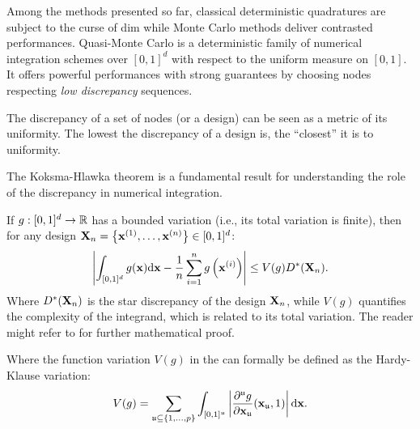 Among the methods presented so far, classical deterministic quadratures are subject to the curse of dim while Monte Carlo methods deliver contrasted performances. 
Quasi-Monte Carlo is a deterministic family of numerical integration schemes over $[0, 1]^d$ with respect to the uniform measure on $[0, 1]$. 
It offers powerful performances with strong guarantees by choosing nodes respecting \textit{low discrepancy} sequences. 

The discrepancy of a set of nodes (or a design) can be seen as a metric of its uniformity. 
The lowest the discrepancy of a design is, the ``closest'' it is to uniformity. 

The Koksma-Hlawka theorem \citep*{morokoff_1995,leobacher_2014} is a fundamental result for understanding the role of the discrepancy in numerical integration. 
\begin{theorem}
    If $g:[0, 1]^d\rightarrow\mathbb{R}$ has a bounded variation (i.e., its total variation is finite), then for any design ${\bf X}_n = \left\{{\bf x}^{(1)}, \dots, {\bf x}^{(n)}\right\} \in [0, 1]^d$:
    \begin{equation}
        \left| \int_{[0, 1]^d} g({\bf x}) \mathrm{d}{\bf x} - \frac1n \sum_{i=1}^n g\left({\bf x}^{(i)}\right)\right| \leq  V(g) D^*({\bf X}_n).
        \label{eq:KH_inequality}
    \end{equation}
    Where $D^*({\bf X}_n)$ is the star discrepancy of the design ${\bf X}_n$, while $V(g)$ quantifies the complexity of the integrand, which is related to its total variation. 
    The reader might refer to  for further mathematical proof.
\end{theorem}

Where the function variation $V(g)$ in the  can formally be defined as the Hardy-Klause variation: 
\begin{equation}
    V(g) = \sum_{\mathfrak{u}\subseteq\{1, \dots, p \}} \int_{[0, 1]^\mathfrak{u}} \left| \frac{\partial^{\mathfrak{u}}g}{\partial {\bf x}_{\mathfrak{u}}}({\bf x}_{\mathfrak{u}}, 1)\right| \mathrm{d}{\bf x}.
\end{equation}

